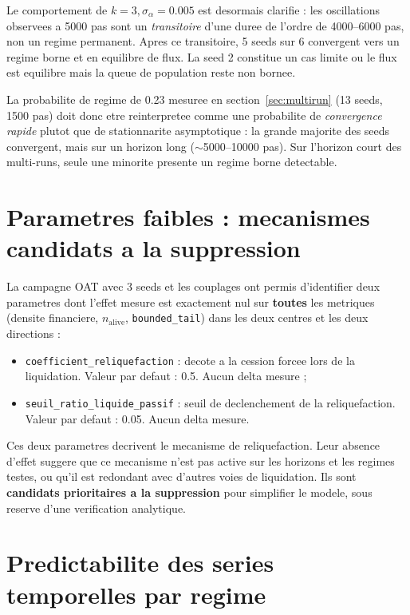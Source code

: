 \documentclass[11pt,a4paper]{article}
\begin{document}
Le comportement de \(k=3, \sigma_\alpha=0.005\) est desormais clarifie : les oscillations
observees a 5000 pas sont un \emph{transitoire} d'une duree de l'ordre de 4000--6000 pas,
non un regime permanent. Apres ce transitoire, 5 seeds sur 6 convergent vers un regime
borne et en equilibre de flux. La seed 2 constitue un cas limite ou le flux est equilibre
mais la queue de population reste non bornee.

La probabilite de regime de 0.23 mesuree en section~\ref{sec:multirun} (13 seeds, 1500 pas)
doit donc etre reinterpretee comme une probabilite de \emph{convergence rapide} plutot que
de stationnarite asymptotique : la grande majorite des seeds convergent, mais sur un horizon
long (\(\sim\)5000--10000 pas). Sur l'horizon court des multi-runs, seule une minorite
presente un regime borne detectable.

\section{Parametres faibles : mecanismes candidats a la suppression}
\label{sec:parametres-faibles}

La campagne OAT avec 3 seeds et les couplages ont permis d'identifier deux
parametres dont l'effet mesure est exactement nul sur \textbf{toutes} les
metriques (densite financiere, \(n_{\mathrm{alive}}\), \texttt{bounded\_tail})
dans les deux centres et les deux directions :

\begin{itemize}
  \item \texttt{coefficient\_reliquefaction} : decote a la cession forcee
  lors de la liquidation. Valeur par defaut : 0.5. Aucun delta mesure ;
  \item \texttt{seuil\_ratio\_liquide\_passif} : seuil de declenchement de
  la reliquefaction. Valeur par defaut : 0.05. Aucun delta mesure.
\end{itemize}

Ces deux parametres decrivent le mecanisme de reliquefaction. Leur absence
d'effet suggere que ce mecanisme n'est pas active sur les horizons et les
regimes testes, ou qu'il est redondant avec d'autres voies de liquidation.
Ils sont \textbf{candidats prioritaires a la suppression} pour simplifier
le modele, sous reserve d'une verification analytique.

\section{Predictabilite des series temporelles par regime}
\label{sec:predictabilite}
\end{document}

